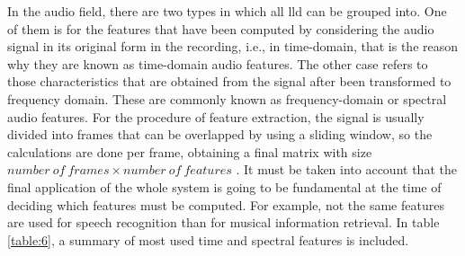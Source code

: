 	In the audio field, there are two types in which all \acrshort{lld} can be grouped into. One of them is for the features that have been computed by considering the audio signal in its original form in the recording, i.e., in time-domain, that is the reason why they are known as time-domain audio features. The other case refers to those characteristics that are obtained from the signal after been transformed to frequency domain. These are commonly known as frequency-domain or spectral audio features. For the procedure of feature extraction, the signal is usually divided into frames that can be overlapped by using a sliding window, so the calculations are done per frame, obtaining a final matrix with size $number\ of\ frames \times number\ of\ features$ \cite{Giannakopoulos2014}. It must be taken into account that the final application of the whole system is going to be fundamental at the time of deciding which features must be computed. For example, not the same features are used for speech recognition than for musical information retrieval. In table \ref{table:6}, a summary of most used time and spectral features is included.
	
